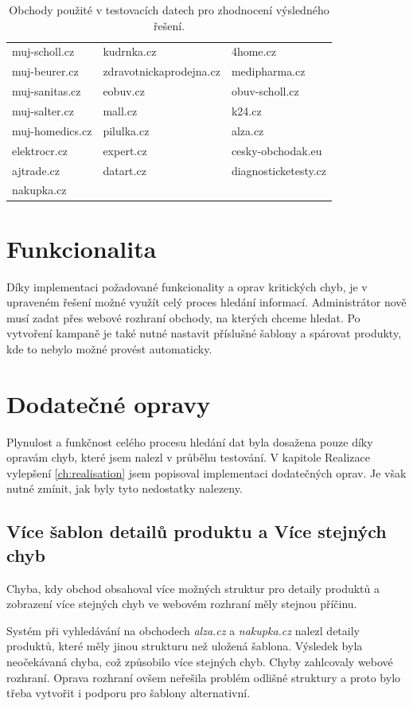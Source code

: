 \documentclass[thesis=B,czech]{FITthesis}[2012/06/26]
\begin{document}
\begin{table}
\centering
\begin{tabular}{ | l | l | l |}
\toprule
muj-scholl.cz & kudrnka.cz & 4home.cz \\
muj-beurer.cz & zdravotnickaprodejna.cz & medipharma.cz \\
muj-sanitas.cz & eobuv.cz & obuv-scholl.cz \\
muj-salter.cz & mall.cz & k24.cz \\
muj-homedics.cz & pilulka.cz & alza.cz \\
elektrocr.cz & expert.cz & cesky-obchodak.eu \\
ajtrade.cz & datart.cz & diagnosticketesty.cz \\
nakupka.cz & & \\ \bottomrule
\end{tabular}
\caption{Obchody použité v testovacích datech pro zhodnocení výsledného řešení.}
\label{table:product-test-products}
\end{table}

\section{Funkcionalita}
Díky implementaci požadované funkcionality a oprav kritických chyb, je v upraveném řešení možné využít celý proces hledání informací.
Administrátor nově musí zadat přes webové rozhraní obchody, na kterých chceme hledat. Po vytvoření kampaně je také nutné nastavit příslušné šablony 
a spárovat produkty, kde to nebylo možné provést automaticky.

\newpage

\section{Dodatečné opravy}
Plynulost a funkčnost celého procesu hledání dat byla dosažena pouze díky opravám chyb, které jsem nalezl v průběhu testování.
V kapitole Realizace vylepšení \ref{ch:realisation} jsem popisoval implementaci dodatečných oprav. Je však nutné zmínit, jak byly tyto nedostatky nalezeny.

\subsection{Více šablon detailů produktu a Více stejných chyb}
Chyba, kdy obchod obsahoval více možných struktur pro detaily produktů a zobrazení více stejných chyb ve webovém rozhraní měly stejnou příčinu.
\par
Systém při vyhledávání na obchodech \textit{alza.cz} a \textit{nakupka.cz} nalezl detaily produktů, které měly jinou strukturu než uložená šablona.
Výsledek byla neočekávaná chyba, což způsobilo více stejných chyb. Chyby zahlcovaly webové rozhraní. Oprava rozhraní ovšem neřešila
problém odlišné struktury a proto bylo třeba vytvořit i podporu pro šablony alternativní.
\end{document}
